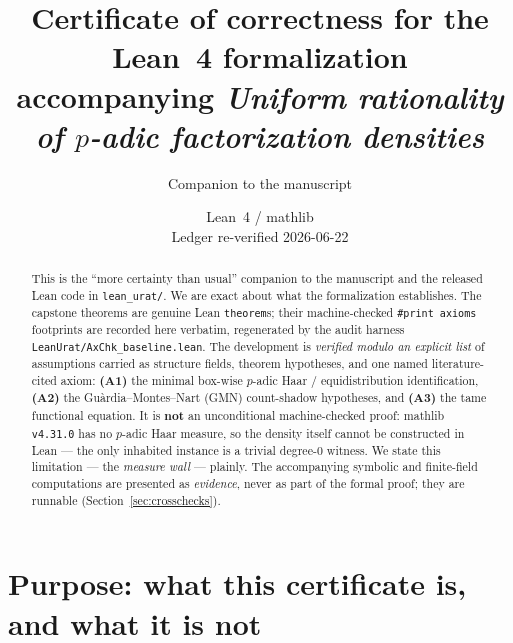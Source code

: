 \documentclass[11pt]{article}
\title{Certificate of correctness for the Lean~4 formalization\\
\large accompanying \emph{Uniform rationality of $p$-adic factorization densities}}
\author{Companion to the manuscript}
\date{Lean~4 \code{v4.31.0} / \textsf{mathlib} \code{v4.31.0}\\
Ledger re-verified 2026-06-22}
\newcommand{\code}[1]{\texttt{#1}}
\newcommand{\modulo}{\textsl{modulo}}
\begin{document}
\maketitle

\begin{abstract}
This is the ``more certainty than usual'' companion to the manuscript and the released
Lean code in \code{lean\_urat/}. We are exact about what the formalization establishes.
The capstone theorems are genuine Lean \code{theorem}s; their machine-checked
\code{\#print axioms} footprints are recorded here verbatim, regenerated by the audit
harness \code{LeanUrat/AxChk\_baseline.lean}. The development is \emph{verified \modulo{}
an explicit list} of assumptions carried as structure fields, theorem hypotheses, and one
named literature-cited axiom: \textbf{(A1)} the minimal box-wise $p$-adic Haar / equidistribution
identification, \textbf{(A2)} the Gu\`ardia--Montes--Nart (GMN) count-shadow hypotheses, and
\textbf{(A3)} the tame functional equation. It is \textbf{not} an unconditional
machine-checked proof: \textsf{mathlib} \code{v4.31.0} has no $p$-adic Haar measure, so
the density itself cannot be constructed in Lean --- the only inhabited instance is a
trivial degree-$0$ witness. We state this limitation --- the \emph{measure wall} ---
plainly. The accompanying symbolic and finite-field computations are presented as
\emph{evidence}, never as part of the formal proof; they are runnable
(Section~\ref{sec:crosschecks}).
\end{abstract}

\tableofcontents

\section{Purpose: what this certificate is, and what it is not}\label{sec:purpose}
\end{document}
